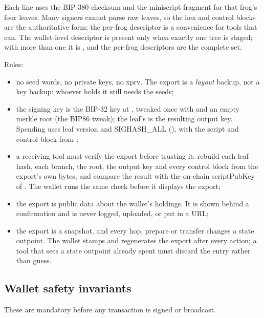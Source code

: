 Each  line uses the BIP-380 checksum and the miniscript
 fragment for that frog's four leaves. Many signers cannot parse
raw leaves, so the  hex and control blocks are the
authoritative form; the per-frog descriptor is a convenience for tools that
can. The wallet-level descriptor is present only when exactly one tree is
staged; with more than one it is , and the per-frog descriptors
are the complete set.

Rules:
\begin{itemize}[leftmargin=1.4em,itemsep=0.25em]
  \item no seed words, no private keys, no xprv. The export is a \emph{layout}
        backup, not a key backup: whoever holds it still needs the seeds;
  \item the signing key is the BIP-32 key at , tweaked once
        with  and an empty merkle root (the BIP86 tweak);
        the leaf's  is the resulting output key. Spending
        uses leaf version  and SIGHASH\_ALL (), with the
        script and control block from ;
  \item a receiving tool must verify the export before trusting it: rebuild
        each leaf hash, each branch, the root, the output key and every
        control block from the export's own bytes, and compare the result
        with the on-chain scriptPubKey of . The wallet
        runs the same check before it displays the export;
  \item the export is public data about the wallet's holdings. It is shown
        behind a confirmation and is never logged, uploaded, or put in a URL;
  \item the export is a snapshot, and every hop, prepare or transfer changes
        a state outpoint. The wallet stamps  and regenerates
        the export after every action; a tool that sees a state outpoint
        already spent must discard the entry rather than guess.
\end{itemize}

\subsection{Wallet safety invariants}

These are mandatory before any transaction is signed or broadcast.

